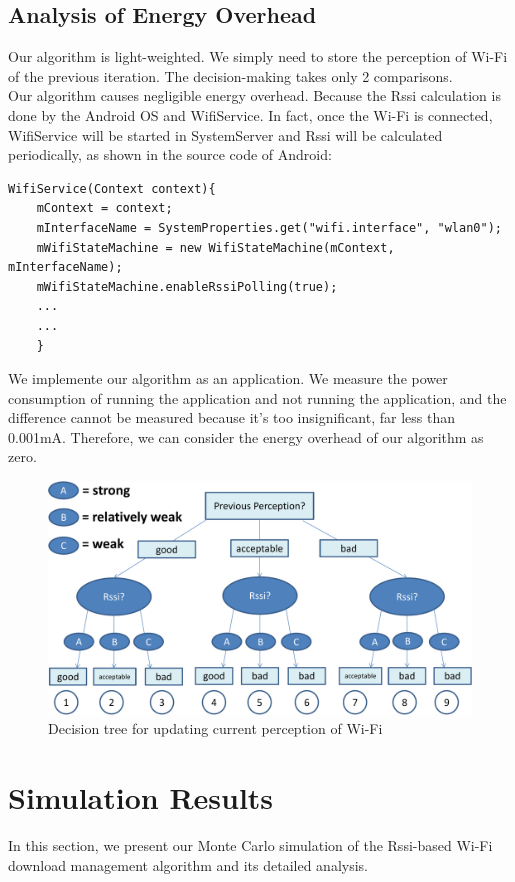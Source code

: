 \documentclass[journal]{IEEEtran}
\begin{document}
\subsection{Analysis of Energy Overhead}
Our algorithm is light-weighted. We simply need to store the perception of Wi-Fi of the previous iteration. The decision-making takes only 2 comparisons.
\\
\indent
Our algorithm causes negligible energy overhead. Because the Rssi calculation is done by the Android OS and WifiService. 
In fact, once the Wi-Fi is connected, 
WifiService will be started in SystemServer and Rssi will be calculated periodically, as shown in the source code of Android:
\begin{lstlisting}
WifiService(Context context){
    mContext = context;
    mInterfaceName = SystemProperties.get("wifi.interface", "wlan0");
    mWifiStateMachine = new WifiStateMachine(mContext, mInterfaceName);
    mWifiStateMachine.enableRssiPolling(true);
    ...
    ...
    }
\end{lstlisting}
\par
We implemente our algorithm as an application. We measure the power consumption of running the application and not running the application, and the 
difference cannot be measured because it's too insignificant, far less than 0.001mA. Therefore, we can consider the energy overhead of our algorithm
as zero.

\begin{figure}
\centering
\includegraphics[scale=0.35]{updatePerception.pdf}
\caption{Decision tree for updating current perception of Wi-Fi}
\end{figure}

\section{Simulation Results}
In this section, we present our Monte Carlo simulation of the Rssi-based Wi-Fi download management algorithm and its detailed analysis.
\end{document}
